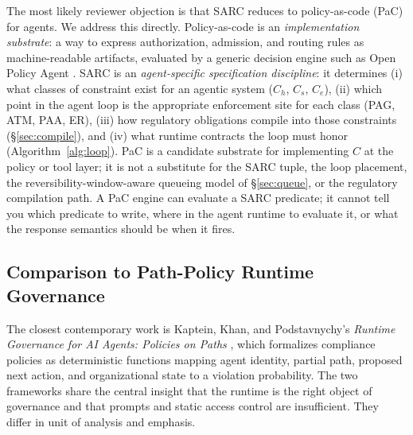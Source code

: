 \documentclass[11pt,a4paper]{article}
\theoremstyle{remark}
\begin{document}
The most likely reviewer objection is that SARC reduces to policy-as-code (PaC) for agents. We address this directly. Policy-as-code is an \emph{implementation substrate}: a way to express authorization, admission, and routing rules as machine-readable artifacts, evaluated by a generic decision engine such as Open Policy Agent \cite{jin2017opa}. SARC is an \emph{agent-specific specification discipline}: it determines (i) what classes of constraint exist for an agentic system ($C_h$, $C_s$, $C_e$), (ii) which point in the agent loop is the appropriate enforcement site for each class (PAG, ATM, PAA, ER), (iii) how regulatory obligations compile into those constraints (\S\ref{sec:compile}), and (iv) what runtime contracts the loop must honor (Algorithm~\ref{alg:loop}). PaC is a candidate substrate for implementing $C$ at the policy or tool layer; it is not a substitute for the SARC tuple, the loop placement, the reversibility-window-aware queueing model of \S\ref{sec:queue}, or the regulatory compilation path. A PaC engine can evaluate a SARC predicate; it cannot tell you which predicate to write, where in the agent runtime to evaluate it, or what the response semantics should be when it fires.

\subsection{Comparison to Path-Policy Runtime Governance}\label{sec:vs-paths}

The closest contemporary work is Kaptein, Khan, and Podstavnychy's \emph{Runtime Governance for AI Agents: Policies on Paths} \cite{kaptein2026paths}, which formalizes compliance policies as deterministic functions mapping agent identity, partial path, proposed next action, and organizational state to a violation probability. The two frameworks share the central insight that the runtime is the right object of governance and that prompts and static access control are insufficient. They differ in unit of analysis and emphasis.
\end{document}
